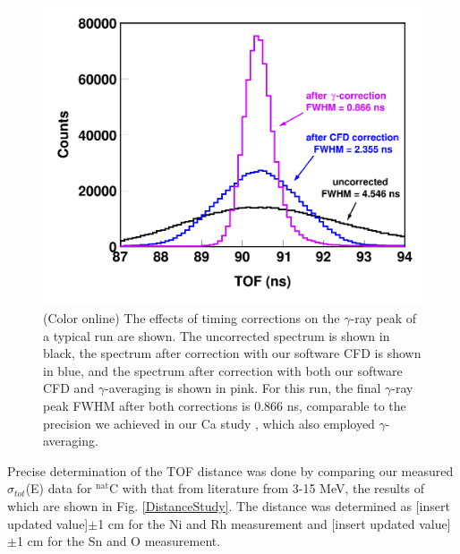 \documentclass[twocolumn,secnumarabic,amssymb, nobibnotes, aps, prl,
superscriptaddress, nobalancelastpage]{revtex4}
\newcommand{\totEs}{\ensuremath{\sigma_{tot}}(E)\,\,}
\begin{document}
\begin{figure}
    \includegraphics[scale=0.24]{figures/TimeCorrections.png}
    \caption{(Color online) The effects of timing corrections on the $\gamma$-ray
        peak of a typical run are shown. The uncorrected spectrum is shown in black,
        the spectrum after correction with our software CFD is shown in blue,
        and the spectrum after correction with both our software CFD and
        $\gamma$-averaging is 
        shown in pink. For this run, the final $\gamma$-ray peak 
        FWHM after both corrections is 0.866 ns, comparable to the precision we
        achieved in our Ca study \cite{Shane2010}, which also employed $\gamma$-
        averaging.
        }
    \label{TimingCorrectionStudy}
\end{figure}


Precise determination of the TOF distance was done by comparing our measured \totEs data
for $^{\text{nat}}$C with that from literature from 3-15 MeV, the results of which are
shown in Fig. \ref{DistanceStudy}. The distance was determined as [insert
updated value]$\pm$1 cm for the Ni and Rh measurement and [insert updated value]$\pm$1 cm 
for the Sn and O measurement.
\end{document}
